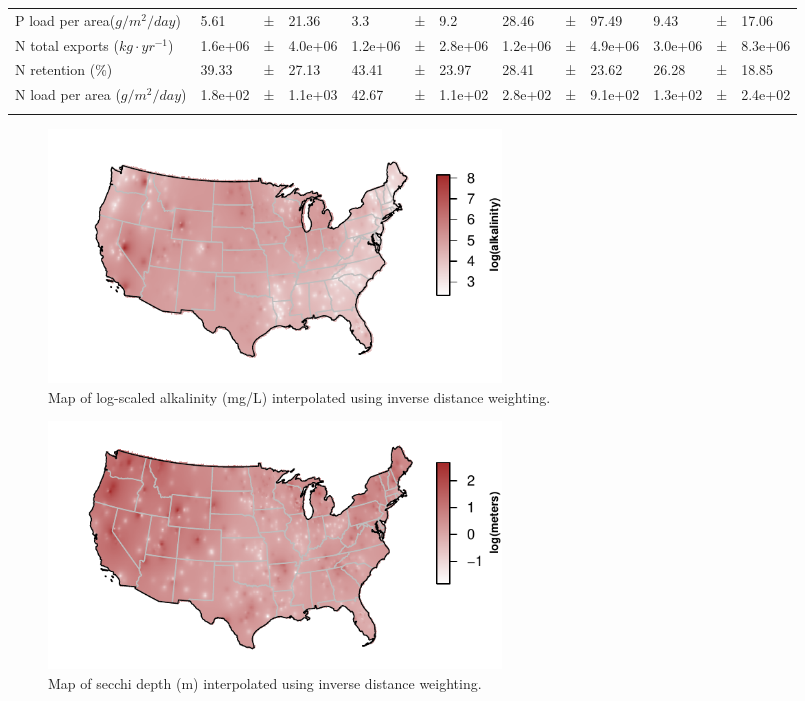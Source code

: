 \documentclass[journal abbreviations, manuscript]{copernicus}
\begin{document}
\begin{table}[t]
\begin{tabular}{lllllllllllll}
P load per area($g / m^{2} / day$) & 5.61 & ± & 21.36 & 3.3 & ± & 9.2 & 28.46 & ± & 97.49 & 9.43 & ± & 17.06\\

N total exports ($kg \cdot yr^{-1}$) & 1.6e+06 & ± & 4.0e+06 & 1.2e+06 & ± & 2.8e+06 & 1.2e+06 & ± & 4.9e+06 & 3.0e+06 & ± & 8.3e+06\\

N retention (\%) & 39.33 & ± & 27.13 & 43.41 & ± & 23.97 & 28.41 & ± & 23.62 & 26.28 & ± & 18.85\\

N load per area ($g / m^{2} / day$) & 1.8e+02 & ± & 1.1e+03 & 42.67 & ± & 1.1e+02 & 2.8e+02 & ± & 9.1e+02 & 1.3e+02 & ± & 2.4e+02\\
\bottomhline
\end{tabular}
\end{table}

\begin{figure}[t]
  \includegraphics[width=12cm]{alkalinity-crop.pdf}
  \caption{Map of log-scaled alkalinity (mg/L) interpolated using inverse distance weighting.}\label{fig:alkalinity}
\end{figure}

\begin{figure}[t]
  \includegraphics[width=12cm]{secchi-crop.pdf}
  \caption{Map of secchi depth (m) interpolated using inverse distance weighting.}\label{fig:secchi}
\end{figure}
\end{document}
